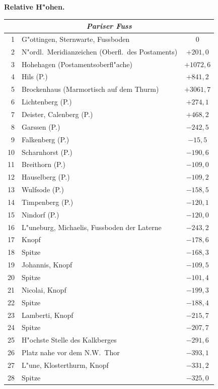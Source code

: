 \documentclass[12pt,a4paper]{article}
\theoremstyle{plain}
\theoremstyle{definition}
\theoremstyle{remark}
\begin{document}
\newpage
\noindent \textbf{Relative H"ohen.}\\[1ex]
\begin{tabular}{r|l|c}
\multicolumn{3}{c}{\textit{Pariser Fuss}} \\[0.5ex]
\hline
1 & G"ottingen, Sternwarte, Fussboden & 0 \\
2 & N"ordl.\ Meridianzeichen (Oberfl.\ des Postaments) & $+201,\!0$ \\
3 & Hohehagen (Postamentsoberfl"ache) & $+1072,\!6$ \\
4 & Hils (P.) & $+841,\!2$ \\
5 & Brockenhaus (Marmortisch auf dem Thurm) & $+3061,\!7$ \\
6 & Lichtenberg (P.) & $+274,\!1$ \\
7 & Deister, Calenberg (P.) & $+468,\!2$ \\
8 & Garssen (P.) & $-242,\!5$ \\
9 & Falkenberg (P.) & $-15,\!5$ \\
10 & Scharnhorst (P.) & $-190,\!6$ \\
11 & Breithorn (P.) & $-109,\!0$ \\
12 & Hauselberg (P.) & $-109,\!2$ \\
13 & Wulfsode (P.) & $-158,\!5$ \\
14 & Timpenberg (P.) & $-120,\!1$ \\
15 & Nindorf (P.) & $-120,\!0$ \\
16 & L"uneburg, Michaelis, Fussboden der Laterne & $-243,\!2$ \\
17 & \quad\quad\quad Knopf & $-178,\!6$ \\
18 & \quad\quad\quad Spitze & $-168,\!3$ \\
19 & \quad\quad\quad Johannis, Knopf & $-109,\!5$ \\
20 & \quad\quad\quad \quad\quad\quad Spitze & $-101,\!4$ \\
21 & \quad\quad\quad Nicolai, Knopf & $-199,\!3$ \\
22 & \quad\quad\quad \quad\quad\quad Spitze & $-188,\!4$ \\
23 & \quad\quad\quad Lamberti, Knopf & $-215,\!7$ \\
24 & \quad\quad\quad \quad\quad\quad Spitze & $-207,\!7$ \\
25 & \quad\quad\quad H"ochste Stelle des Kalkberges & $-291,\!6$ \\
26 & \quad\quad\quad Platz nahe vor dem N.W.\ Thor & $-393,\!1$ \\
27 & L"une, Klosterthurm, Knopf & $-331,\!2$ \\
28 & \quad\quad\quad\quad\quad\quad Spitze & $-325,\!0$ \\
\hline
\end{tabular}
\end{document}

